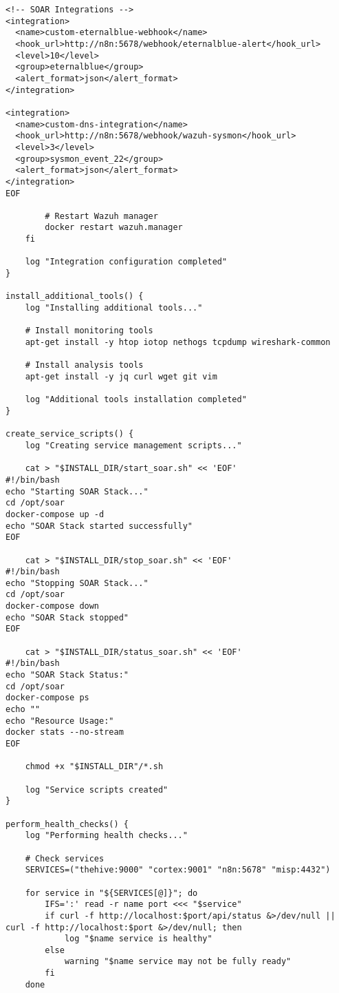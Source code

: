 \begin{lstlisting}[style=bashstyle,caption=Script d'installation complete de la stack SOAR]
<!-- SOAR Integrations -->
<integration>
  <name>custom-eternalblue-webhook</name>
  <hook_url>http://n8n:5678/webhook/eternalblue-alert</hook_url>
  <level>10</level>
  <group>eternalblue</group>
  <alert_format>json</alert_format>
</integration>

<integration>
  <name>custom-dns-integration</name>
  <hook_url>http://n8n:5678/webhook/wazuh-sysmon</hook_url>
  <level>3</level>
  <group>sysmon_event_22</group>
  <alert_format>json</alert_format>
</integration>
EOF
        
        # Restart Wazuh manager
        docker restart wazuh.manager
    fi
    
    log "Integration configuration completed"
}

install_additional_tools() {
    log "Installing additional tools..."
    
    # Install monitoring tools
    apt-get install -y htop iotop nethogs tcpdump wireshark-common
    
    # Install analysis tools
    apt-get install -y jq curl wget git vim
    
    log "Additional tools installation completed"
}

create_service_scripts() {
    log "Creating service management scripts..."
    
    cat > "$INSTALL_DIR/start_soar.sh" << 'EOF'
#!/bin/bash
echo "Starting SOAR Stack..."
cd /opt/soar
docker-compose up -d
echo "SOAR Stack started successfully"
EOF

    cat > "$INSTALL_DIR/stop_soar.sh" << 'EOF'
#!/bin/bash
echo "Stopping SOAR Stack..."
cd /opt/soar
docker-compose down
echo "SOAR Stack stopped"
EOF

    cat > "$INSTALL_DIR/status_soar.sh" << 'EOF'
#!/bin/bash
echo "SOAR Stack Status:"
cd /opt/soar
docker-compose ps
echo ""
echo "Resource Usage:"
docker stats --no-stream
EOF

    chmod +x "$INSTALL_DIR"/*.sh
    
    log "Service scripts created"
}

perform_health_checks() {
    log "Performing health checks..."
    
    # Check services
    SERVICES=("thehive:9000" "cortex:9001" "n8n:5678" "misp:4432")
    
    for service in "${SERVICES[@]}"; do
        IFS=':' read -r name port <<< "$service"
        if curl -f http://localhost:$port/api/status &>/dev/null || curl -f http://localhost:$port &>/dev/null; then
            log "$name service is healthy"
        else
            warning "$name service may not be fully ready"
        fi
    done
    

\end{lstlisting}
